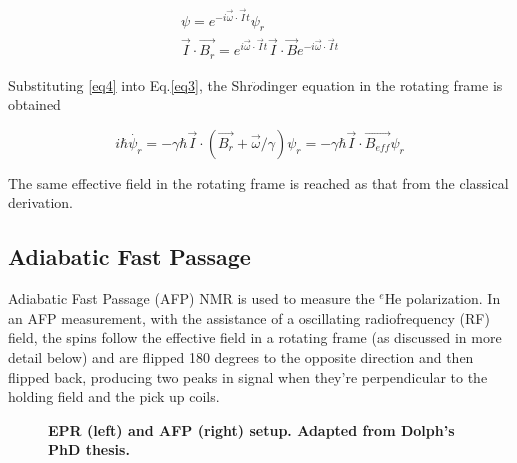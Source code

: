\begin{subequations}\label{eq4}
	\begin{gather}
	\psi=e^{-i\vec{\omega}\cdot \vec{I}t}\psi_{r} \\
	\vec{I}\cdot \vec{B_{r}} = e^{i\vec{\omega}\cdot \vec{I}t}\vec{I}\cdot \vec{B} e^{-i\vec{\omega}\cdot \vec{I}t}
	\end{gather}
\end{subequations}

Substituting \ref{eq4} into Eq.\ref{eq3}, the Shr$\ddot{o}$dinger equation in the rotating frame is obtained

\begin{equation}
i\hbar \dot{\psi_{r}}=-\gamma \hbar \vec{I}\cdot(\vec{B_{r}} + \vec{\omega}/\gamma)\psi_{r}=-\gamma \hbar \vec{I}\cdot\vec{B_{eff}}\psi_{r}
\end{equation}

The same effective field in the rotating frame is reached as that from the classical derivation.

\subsection{Adiabatic Fast Passage}

Adiabatic Fast Passage (AFP) NMR is used to measure the $^{e}$He polarization. In an AFP measurement, with the assistance of a oscillating radiofrequency (RF) field, the spins follow the effective field in a rotating frame (as discussed in more detail below) and are flipped 180 degrees to the opposite direction and then flipped back, producing two peaks in signal when they're perpendicular to the holding field and the pick up coils.

\begin{figure}[H]
	\centering
	\caption{{\bf EPR (left) and AFP (right) setup. Adapted from Dolph's PhD thesis.}}
	\label{AFPandEPRsetup}
\end{figure}

